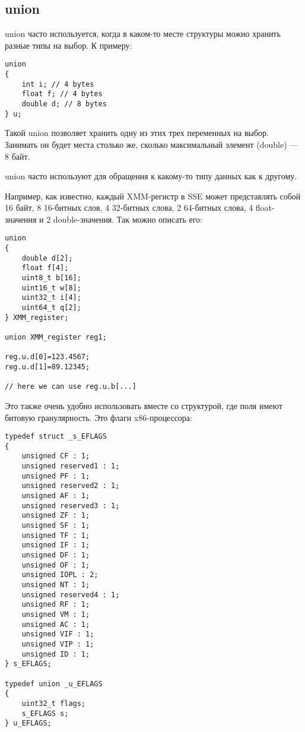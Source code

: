 ﻿\subsection{union}

union часто используется, когда в каком-то месте структуры можно хранить разные типы на выбор.
К примеру:

\begin{lstlisting}
union
{
	int i; // 4 bytes
	float f; // 4 bytes
	double d; // 8 bytes
} u;
\end{lstlisting}

Такой union позволяет хранить одну из этих трех переменных на выбор. Занимать он будет места столько же,
сколько максимальный элемент (double) --- 8 байт.

union часто используют для обращения к какому-то типу данных как к другому.

Например, как известно, каждый XMM-регистр в SSE может представлять собой 16 байт, 8 16-битных слов,
4 32-битных слова, 2 64-битных слова, 4 float-значения и 2 double-значения. Так можно описать его:

\begin{lstlisting}
union
{
	double d[2];
	float f[4];
	uint8_t b[16];
	uint16_t w[8];
	uint32_t i[4];
	uint64_t q[2];
} XMM_register;

union XMM_register reg1;

reg.u.d[0]=123.4567;
reg.u.d[1]=89.12345;

// here we can use reg.u.b[...]

\end{lstlisting}

Это также очень удобно использовать вместе со структурой, где поля имеют битовую гранулярность.
Это флаги x86-процессора:

\begin{lstlisting}
typedef struct _s_EFLAGS
{
    unsigned CF : 1;
    unsigned reserved1 : 1;
    unsigned PF : 1;
    unsigned reserved2 : 1;
    unsigned AF : 1;
    unsigned reserved3 : 1;
    unsigned ZF : 1;
    unsigned SF : 1;
    unsigned TF : 1;
    unsigned IF : 1;
    unsigned DF : 1;
    unsigned OF : 1;
    unsigned IOPL : 2;
    unsigned NT : 1;
    unsigned reserved4 : 1;
    unsigned RF : 1;
    unsigned VM : 1;
    unsigned AC : 1;
    unsigned VIF : 1;
    unsigned VIP : 1;
    unsigned ID : 1;
} s_EFLAGS;

typedef union _u_EFLAGS
{
    uint32_t flags;
    s_EFLAGS s;
} u_EFLAGS;
\end{lstlisting}

